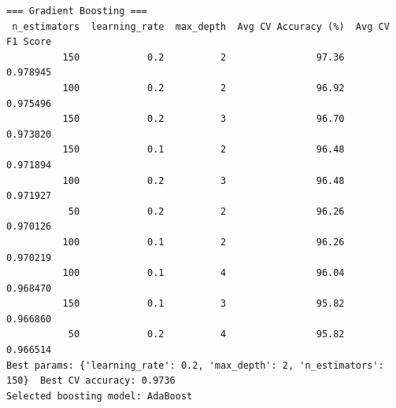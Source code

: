\documentclass[12pt,a4paper]{article}
\begin{document}
\begin{verbatim}
=== Gradient Boosting ===
 n_estimators  learning_rate  max_depth  Avg CV Accuracy (%)  Avg CV F1 Score
          150            0.2          2                97.36         0.978945
          100            0.2          2                96.92         0.975496
          150            0.2          3                96.70         0.973820
          150            0.1          2                96.48         0.971894
          100            0.2          3                96.48         0.971927
           50            0.2          2                96.26         0.970126
          100            0.1          2                96.26         0.970219
          100            0.1          4                96.04         0.968470
          150            0.1          3                95.82         0.966860
           50            0.2          4                95.82         0.966514
Best params: {'learning_rate': 0.2, 'max_depth': 2, 'n_estimators': 150}  Best CV accuracy: 0.9736
Selected boosting model: AdaBoost
\end{verbatim}
\end{document}
